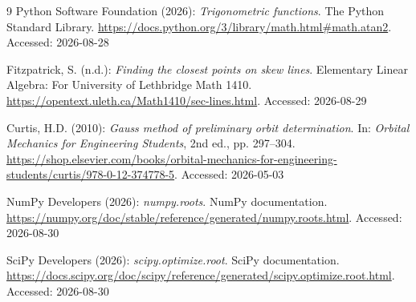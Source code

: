 \documentclass[11pt,a4paper]{article}
\begin{document}
\begin{thebibliography}{9}
		Python Software Foundation (2026): \emph{Trigonometric functions}.
		The Python Standard Library.\newline
		\url{https://docs.python.org/3/library/math.html#math.atan2}.\newline
		Accessed: 2026-08-28
		
		Fitzpatrick, S. (n.d.): \emph{Finding the closest points on skew lines}.
		Elementary Linear Algebra: For University of Lethbridge Math 1410.\newline
		\url{https://opentext.uleth.ca/Math1410/sec-lines.html}.\newline
		Accessed: 2026-08-29
		
		Curtis, H.D. (2010): \emph{Gauss method of preliminary orbit determination}.
		In: \emph{Orbital Mechanics for Engineering Students}, 2nd ed.,
		pp. 297--304.\newline
		\url{https://shop.elsevier.com/books/orbital-mechanics-for-engineering-students/curtis/978-0-12-374778-5}.\newline
		Accessed: 2026-05-03
		
		NumPy Developers (2026): \emph{numpy.roots}. NumPy documentation.\newline
		\url{https://numpy.org/doc/stable/reference/generated/numpy.roots.html}.\newline
		Accessed: 2026-08-30
		
		SciPy Developers (2026): \emph{scipy.optimize.root}. SciPy documentation.\newline
		\url{https://docs.scipy.org/doc/scipy/reference/generated/scipy.optimize.root.html}.\newline
		Accessed: 2026-08-30
		
	\end{thebibliography}
\end{document}
